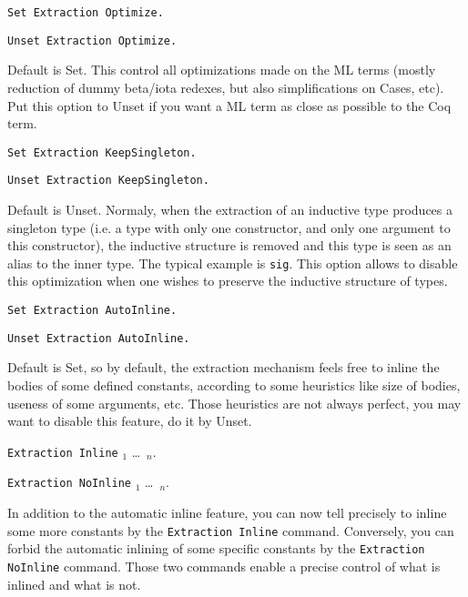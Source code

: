 \begin{description}

\item {}
{\tt Set Extraction Optimize.}

\item {}
{\tt Unset Extraction Optimize.}

Default is Set. This control all optimizations made on the ML terms 
(mostly reduction of dummy beta/iota redexes, but also simplifications on
Cases, etc). Put this option to Unset if you want a ML term as close as 
possible to the Coq term.

\item {}
{\tt Set Extraction KeepSingleton.}

\item {}
{\tt Unset Extraction KeepSingleton.}

Default is Unset. Normaly, when the extraction of an inductive type
produces a singleton type (i.e. a type with only one constructor, and
only one argument to this constructor), the inductive structure is
removed and this type is seen as an alias to the inner type.
The typical example is {\tt sig}. This option allows to disable this
optimization when one wishes to preserve the inductive structure of types.

\item {}
{\tt Set Extraction AutoInline.} 

\item {}
{\tt Unset Extraction AutoInline.} 

Default is Set, so by default, the extraction mechanism feels free to 
inline the bodies of some defined constants, according to some heuristics 
like size of bodies, useness of some arguments, etc. Those heuristics are 
not always perfect, you may want to disable this feature, do it by Unset. 

\item {}
{\tt Extraction Inline} \qualid$_1$ \dots\ \qualid$_n$. 

\item {}
{\tt Extraction NoInline} \qualid$_1$ \dots\ \qualid$_n$. 

In addition to the automatic inline feature, you can now tell precisely to 
inline some more constants by the {\tt Extraction Inline} command. Conversely, 
you can forbid the automatic inlining of some specific constants by
the {\tt Extraction NoInline} command.
Those two commands enable a precise control of what is inlined and what is not. 


\end{description}
